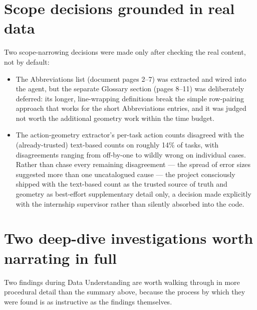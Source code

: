 \section{Scope decisions grounded in real data}
Two scope-narrowing decisions were made only after checking the real content, not by default:

\begin{itemize}
\item The Abbreviations list (document pages 2–7) was extracted and wired into the agent, but the separate Glossary section (pages 8–11) was deliberately deferred: its longer, line-wrapping definitions break the simple row-pairing approach that works for the short Abbreviations entries, and it was judged not worth the additional geometry work within the time budget.
\item The action-geometry extractor's per-task action counts disagreed with the (already-trusted) text-based counts on roughly 14\% of tasks, with disagreements ranging from off-by-one to wildly wrong on individual cases. Rather than chase every remaining disagreement — the spread of error sizes suggested more than one uncatalogued cause — the project consciously shipped with the text-based count as the trusted source of truth and geometry as best-effort supplementary detail only, a decision made explicitly with the internship supervisor rather than silently absorbed into the code.
\end{itemize}
\section{Two deep-dive investigations worth narrating in full}
Two findings during Data Understanding are worth walking through in more procedural detail than the summary above, because the process by which they were found is as instructive as the findings themselves.

